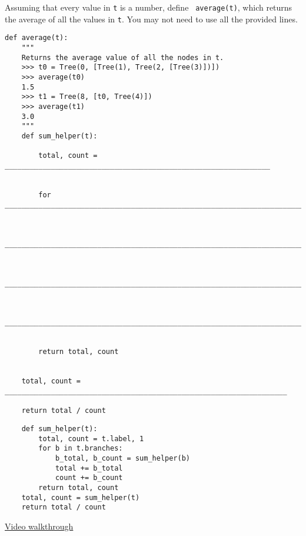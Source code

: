 \question Assuming that every value in {\tt t} is a number, define {\tt
average(t)}, which returns the average of all the values in {\tt t}.
You may not need to use all the provided lines.

\begin{lstlisting}
def average(t):
    """
    Returns the average value of all the nodes in t.
    >>> t0 = Tree(0, [Tree(1), Tree(2, [Tree(3)])])
    >>> average(t0)
    1.5
    >>> t1 = Tree(8, [t0, Tree(4)])
    >>> average(t1)
    3.0
    """
    def sum_helper(t):

        total, count = _______________________________________________________________


        for __________________________________________________________________________:


            __________________________________________________________________________


            __________________________________________________________________________


            __________________________________________________________________________


        return total, count


    total, count = ___________________________________________________________________

    return total / count
\end{lstlisting}
\begin{solution}[0in]
\begin{lstlisting}
    def sum_helper(t):
        total, count = t.label, 1
        for b in t.branches:
            b_total, b_count = sum_helper(b)
            total += b_total
            count += b_count
        return total, count
    total, count = sum_helper(t)
    return total / count
\end{lstlisting}
\href{https://youtu.be/AYKHLcMJmJ4}{Video walkthrough}
\end{solution}
